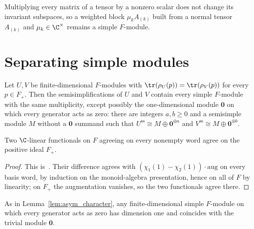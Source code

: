 Multiplying every matrix of a tensor by a nonzero scalar does not change its
invariant subspaces, so a weighted block $\mu_kA_{(k)}$ built from a normal
tensor $A_{(k)}$ and $\mu_k\in\C^\times$ remains a simple $F$-module.

\section{Separating simple modules}%
\label{sec:asym_separation}

\begin{lemma}
    \label{lem:asym_character}
    \notready
    Let $U,V$ be finite-dimensional $F$-modules with
    $\tr(\rho_U(p))=\tr(\rho_V(p))$ for every $p\in F_+$. Then the
    semisimplifications of $U$ and $V$ contain every simple $F$-module with
    the same multiplicity, except possibly the one-dimensional module
    $\mathbf0$ on which every generator acts as zero: there are integers
    $a,b\geq0$ and a semisimple module $M$ without a $\mathbf0$ summand such
    that $U^{\mathrm{ss}}\cong M\oplus\mathbf0^{\oplus a}$ and
    $V^{\mathrm{ss}}\cong M\oplus\mathbf0^{\oplus b}$.
\end{lemma}

\begin{lemma}
    \label{lem:asym_ker_aug_separation}
    \leanok
    Two $\C$-linear functionals on $F$ agreeing on every nonempty word
    agree on the positive ideal $F_+$.
\end{lemma}

\begin{proof}
    \leanok
    This is~\cite[``Positive-ideal separation of linear
        functionals'']{QICLean2026Blueprint}.
    Their difference agrees with $(\chi_1(1)-\chi_2(1))\cdot\mathrm{aug}$ on
    every basis word, by induction on the monoid-algebra presentation, hence
    on all of $F$ by linearity; on $F_+$ the augmentation vanishes, so the
    two functionals agree there.
\end{proof}

\begin{lemma}
    \label{lem:asym_zero_module}
    \leanok
    As in Lemma~\ref{lem:asym_character}, any finite-dimensional simple
    $F$-module on which every generator acts as zero has dimension one and
    coincides with the trivial module $\mathbf0$.
\end{lemma}

